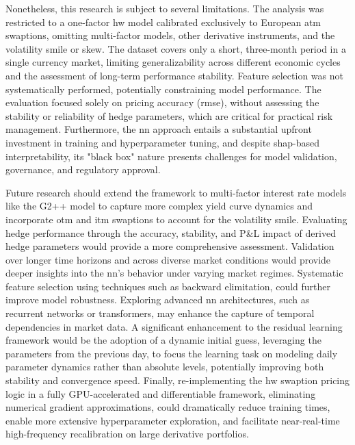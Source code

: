 Nonetheless, this research is subject to several limitations. The analysis was restricted to a one-factor \ac{hw} model calibrated exclusively to European \ac{atm} swaptions, omitting multi-factor models, other derivative instruments, and the volatility smile or skew. The dataset covers only a short, three-month period in a single currency market, limiting generalizability across different economic cycles and the assessment of long-term performance stability. Feature selection was not systematically performed, potentially constraining model performance. The evaluation focused solely on pricing accuracy (\ac{rmse}), without assessing the stability or reliability of hedge parameters, which are critical for practical risk management. Furthermore, the \ac{nn} approach entails a substantial upfront investment in training and hyperparameter tuning, and despite \ac{shap}-based interpretability, its "black box" nature presents challenges for model validation, governance, and regulatory approval.  

Future research should extend the framework to multi-factor interest rate models like the G2++ model to capture more complex yield curve dynamics and incorporate \ac{otm} and \ac{itm} swaptions to account for the volatility smile. Evaluating hedge performance through the accuracy, stability, and P\&L impact of derived hedge parameters would provide a more comprehensive assessment. Validation over longer time horizons and across diverse market conditions would provide deeper insights into the \ac{nn}'s behavior under varying market regimes. Systematic feature selection using techniques such as backward elimitation, could further improve model robustness. Exploring advanced \ac{nn} architectures, such as recurrent networks or transformers, may enhance the capture of temporal dependencies in market data. A significant enhancement to the residual learning framework would be the adoption of a dynamic initial guess, leveraging the parameters from the previous day, to focus the learning task on modeling daily parameter dynamics rather than absolute levels, potentially improving both stability and convergence speed. Finally, re-implementing the \ac{hw} swaption pricing logic in a fully GPU-accelerated and differentiable framework, eliminating numerical gradient approximations, could dramatically reduce training times, enable more extensive hyperparameter exploration, and facilitate near-real-time high-frequency recalibration on large derivative portfolios.
